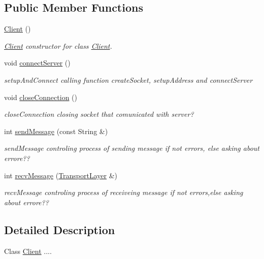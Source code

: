 \subsection*{Public Member Functions}
\begin{DoxyCompactItemize}
\item 
\hyperlink{classClient_ae51af7aa6b8f591496a8f6a4a87a14bf}{Client} ()
\begin{DoxyCompactList}\small\item\em \hyperlink{classClient}{Client} constructor for class \hyperlink{classClient}{Client}. \end{DoxyCompactList}\item 
void \hyperlink{classClient_a1e032189cc8d340550a1a8db868609b2}{connect\+Server} ()
\begin{DoxyCompactList}\small\item\em setup\+And\+Connect calling function create\+Socket, setup\+Address and connect\+Server \end{DoxyCompactList}\item 
void \hyperlink{classClient_a450bc799e79d4a2ef239341b323d38a2}{close\+Connection} ()
\begin{DoxyCompactList}\small\item\em close\+Connection closing socket that comunicated with server? \end{DoxyCompactList}\item 
int \hyperlink{classClient_af4f39b4303028f1e46357f94060ebc2b}{send\+Message} (const String \&)
\begin{DoxyCompactList}\small\item\em send\+Message controling process of sending message if not errors, else asking about errore?? \end{DoxyCompactList}\item 
int \hyperlink{classClient_a81f551d0d21e211e8769adb25a071797}{recv\+Message} (\hyperlink{classTransportLayer}{Transport\+Layer} \&)
\begin{DoxyCompactList}\small\item\em recv\+Message controling process of receiveing message if not errors,else asking about errore?? \end{DoxyCompactList}\end{DoxyCompactItemize}


\subsection{Detailed Description}
Class \hyperlink{classClient}{Client} .... 

